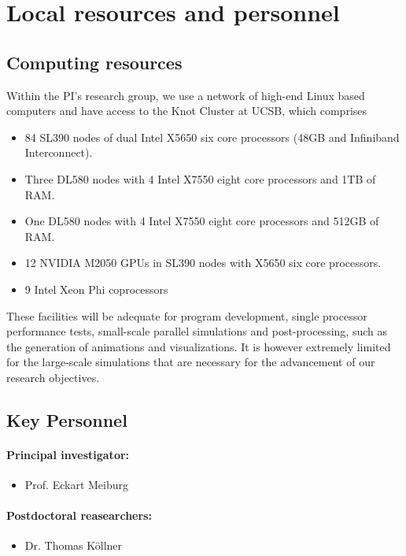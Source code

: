 \documentclass[10pt]{article}
\begin{document}
\section{Local resources and personnel}
\subsection*{Computing resources}
Within the PI’s research group, we use a network of high-end Linux based computers and have access to the Knot Cluster at UCSB, which comprises
\begin{itemize}
 \item 84 SL390 nodes of dual Intel X5650 six core processors (48GB and Infiniband Interconnect). 
 \item Three  DL580 nodes with 4 Intel X7550 eight core processors and 1TB of RAM. 
 \item One DL580 nodes with 4 Intel X7550 eight core processors and 512GB of RAM.
 \item 12 NVIDIA M2050 GPUs in SL390 nodes with X5650 six core processors. 
 \item 9 Intel Xeon Phi coprocessors 
\end{itemize}
These facilities will be adequate for program development, single
processor performance tests, small-scale parallel simulations and post-processing, such as the generation of animations and visualizations. It is however extremely limited for the large-scale simulations that are necessary for the advancement of our research objectives.
\subsection*{Key Personnel}
\label{sec:personnel}
\paragraph{Principal investigator: } 
\begin{itemize}
\item Prof. Eckart Meiburg
\end{itemize} 
\paragraph{Postdoctoral reasearchers: }
\begin{itemize}
\item Dr. Thomas K{\"o}llner
\end{itemize}
\end{document}
